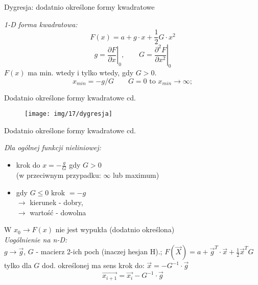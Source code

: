  \begin{frame}{Dygresja: dodatnio określone formy kwadratowe}

  \begin{block}{}
      \emph{1-D forma kwadratowa:}
	  \begin{equation}
	  	F(x) = a + g \cdot x + \frac{1}{2} G \cdot x^2
      \nonumber
	  \end{equation}
    \begin{equation}
      g = \left.\frac{\partial F}{\partial x}\right|_{0}{,}\qquad
      G = \left.\frac{\partial^{2} F}{\partial x^2}\right|_{0}
      \nonumber
    \end{equation}
	 $F(x)$ ma min. wtedy i tylko wtedy, gdy $G > 0$.
    \begin{equation}
	  	 x_{min} = -g/G	\qquad G = 0 \text{ to } x_{min} \rightarrow \infty; 
       
        \nonumber
	 \end{equation}
	 
	\end{block}

  \end{frame}

 \begin{frame}{Dodatnio określone formy kwadratowe cd.}

    \begin{figure}
		\centering
		\texttt{[image: img/17/dygresja]}
	\end{figure}

  \end{frame}

  \begin{frame}{Dodatnio określone formy kwadratowe cd.}

   \begin{block}{}
   \emph{Dla ogólnej funkcji nieliniowej:}
	  \smallskip
	 \begin{itemize}
	  	    \item krok do $x = - \frac{g}{G}$ gdy $G > 0$
	  	    \\(w przeciwnym przypadku: $\infty$ lub maximum)
	  	    \item gdy $G \leq 0$ krok $= -g$
	 	    \\$\rightarrow$ kierunek - dobry,
	 	    \\$\rightarrow$ wartość - dowolna
	   \end{itemize}
	    W $x_0 \rightarrow F(x)$ nie jest wypukła (dodatnio określona)
	   \medskip\\
	   \emph{Uogólnienie na n-D:}\\
	    $g \rightarrow \vec{g}$, $G$ - macierz 2-ich poch (inaczej hesjan  H).;
	   $F(\vec X) = a + \vec{g}^T \cdot \vec{x} + \frac{1}{2} \vec{x}^T G$ tylko dla $G$ dod. określonej
	    ma sens krok do:
	  $	\vec{x} = - G^{-1} \cdot \vec{g}$
	$$\vec{x_{i+1}} = \vec{x_i} - G^{-1} \cdot \vec{g} $$
    \end{block}

  \end{frame}

